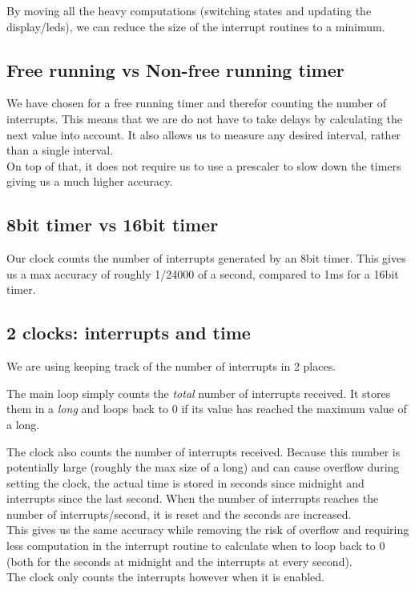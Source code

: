 \documentclass[11pt,a4paper]{scrartcl}
\begin{document}
By moving all the heavy computations (switching states and updating the display/leds), we can reduce the size of the interrupt routines to a minimum.

\subsection{Free running vs Non-free running timer}
We have chosen for a free running timer and therefor counting the number of interrupts. This means that we are do not have to take delays by calculating the next value into account. It also allows us to measure any desired interval, rather than a single interval.\\
On top of that, it does not require us to use a prescaler to slow down the timers giving us a much higher accuracy.

\subsection{8bit timer vs 16bit timer}
Our clock counts the number of interrupts generated by an 8bit timer. This gives us a max accuracy of roughly 1/24000 of a second, compared to 1ms for a 16bit timer.


\subsection{2 clocks: interrupts and time}
We are using keeping track of the number of interrupts in 2 places.

The main loop simply counts the \textit{total} number of interrupts received. It stores them in a \textit{long} and loops back to 0 if its value has reached the maximum value of a long.

The clock also counts the number of interrupts received. Because this number is potentially large (roughly the max size of a long) and can cause overflow during setting the clock, the actual time is stored in seconds since midnight and interrupts since the last second. When the number of interrupts reaches the number of interrupts/second, it is reset and the seconds are increased.\\
This gives us the same accuracy while removing the risk of overflow and requiring less computation in the interrupt routine to calculate when to loop back to 0 (both for the seconds at midnight and the interrupts at every second).\\
The clock only counts the interrupts however when it is enabled.
\end{document}

